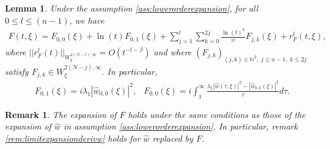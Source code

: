 \documentclass[a4paper, 15pt]{article}
\numberwithin{equation}{section}
\newtheorem{rem}[defi]{Remark}
\newtheorem{lem}[defi]{Lemma}
\begin{document}
 \begin{lem}
 \label{lem:expansionF}
Under the assumption \ref{ass:lowerorderexpansion}, for all $0\leq l\leq(n-1)$, we have 
 \begin{align*}
     F(t,\xi)=F_{0,0}(\xi)+\ln(t)F_{0,1}(\xi)+\sum^{l}_{j=1}\sum^{2j}_{k=0}\frac{\ln(t)^{k}}{\tau^{j}}F_{j,k}(\xi)+ r^{l}_F(t,\xi),
 \end{align*}
where $||r^l_F(t)||_{W^{2(N-l),\infty}_\xi}=O(t^{-l-\beta})$ and where $(F_{j,k})_{(j,k)\in\mathbb{N}^{2},\;j\leq n-1,\;k\leq 2j}$ satisfy $F_{j,k}\in W^{2(N-j),\infty}_\xi$. In particular, 
\begin{align}
&F_{0,1}(\xi)=i\lambda_1|\hat{w}_{0,0}(\xi)|^2, &F_{0,0}(\xi)=i\int^\infty_1\frac{\lambda_1|\hat{w}(\tau,\xi)|^2-|\hat{w}_{0,0}(\xi)|^2}{\tau}d\tau.
\end{align}
 \end{lem}
 \begin{rem}
The expansion of $F$ holds under the same conditions as those of the expansion of $\hat{w}$ in assumption \ref{ass:lowerorderexpansion}. In particular, remark \ref{rem:limitexpansionderivw} holds for $\hat{w}$ replaced by $F$. 
 \end{rem}
\end{document}
